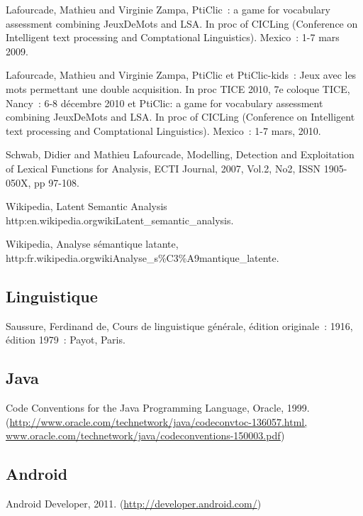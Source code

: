 \documentclass[a4paper,11pt,french]{article}
\def\android{Android\texttrademark{}}
\begin{document}
Lafourcade, Mathieu and Virginie Zampa, PtiClic~: a game for vocabulary assessment combining JeuxDeMots and LSA. In proc of CICLing (Conference on Intelligent text processing and Comptational Linguistics). Mexico~: 1-7 mars 2009.

Lafourcade, Mathieu and Virginie Zampa, PtiClic et PtiClic-kids~: Jeux avec les mots permettant une double acquisition. In proc TICE 2010, 7e coloque TICE, Nancy~: 6-8 décembre 2010 et PtiClic: a game for vocabulary assessment combining JeuxDeMots and LSA. In proc of CICLing (Conference on Intelligent text processing and Comptational Linguistics). Mexico~: 1-7 mars, 2010.

Schwab, Didier and Mathieu Lafourcade, Modelling, Detection and Exploitation of Lexical Functions for Analysis, ECTI Journal, 2007, Vol.2, No2, ISSN 1905-050X, pp 97-108.

Wikipedia, Latent Semantic Analysis http:\/\/en.wikipedia.org\/wiki\/Latent\_semantic\_analysis.

Wikipedia, Analyse sémantique latante, http:\/\/fr.wikipedia.org\/wiki\/Analyse\_s\%C3\%A9mantique\_latente.


\subsection{Linguistique}

Saussure, Ferdinand de, Cours de linguistique générale, édition originale~: 1916, édition 1979~: Payot, Paris. 


\subsection{Java}

Code Conventions for the Java Programming Language, Oracle, 1999. (\url{http://www.oracle.com/technetwork/java/codeconvtoc-136057.html, www.oracle.com/technetwork/java/codeconventions-150003.pdf})

\subsection{\android{}}

Android Developer, 2011. (\url{http://developer.android.com/})





\end{document}
